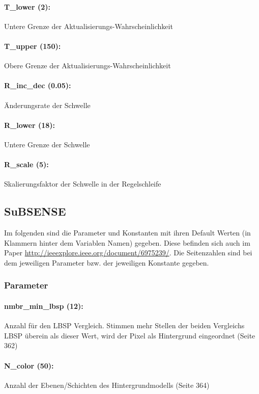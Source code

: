 \documentclass{article}
\begin{document}
	\paragraph*{T\_lower (2):} Untere Grenze der Aktualisierungs-Wahrscheinlichkeit
	\paragraph*{T\_upper (150):} Obere Grenze der Aktualisierungs-Wahrscheinlichkeit
	\paragraph*{R\_inc\_dec (0.05):} \"Anderungsrate der Schwelle
	\paragraph*{R\_lower (18):} Untere Grenze der Schwelle
	\paragraph*{R\_scale (5):} Skalierungsfaktor der Schwelle in der Regelschleife 



	\subsection*{SuBSENSE}
	\label{sub:subsection_name}
	Im folgenden sind die Parameter und Konstanten mit ihren Default Werten (in Klammern hinter dem Variablen Namen) gegeben.
	Diese befinden sich auch im Paper \url{http://ieeexplore.ieee.org/document/6975239/}. Die Seitenzahlen sind bei dem jeweiligen Parameter bzw. der jeweiligen Konstante gegeben.
	\subsubsection*{Parameter}
	\label{ssub:parameter}
	
	\paragraph*{nmbr\_min\_lbsp (12):} Anzahl f\"ur den LBSP Vergleich. Stimmen mehr Stellen der beiden Vergleichs LBSP \"uberein als dieser Wert, wird der Pixel als Hintergrund eingeordnet (Seite 362)
	\paragraph*{N\_color (50):} Anzahl der Ebenen/Schichten des Hintergrundmodells (Seite 364)
\end{document}

